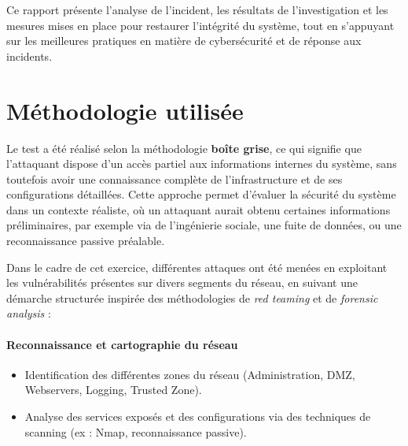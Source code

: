 \documentclass[a4paper,12pt]{report}
\begin{document}
Ce rapport présente l'analyse de l’incident, les résultats de l’investigation et les mesures mises en place pour restaurer l’intégrité du système, tout en s’appuyant sur les meilleures pratiques en matière de cybersécurité et de réponse aux incidents.

\section{Méthodologie utilisée}

Le test a \'et\'e r\'ealis\'e selon la m\'ethodologie \textbf{bo\^ite grise}, ce qui signifie que l’attaquant dispose d’un acc\`es partiel aux informations internes du syst\`eme, sans toutefois avoir une connaissance compl\`ete de l’infrastructure et de ses configurations d\'etaill\'ees. Cette approche permet d’\'evaluer la s\'ecurit\'e du syst\`eme dans un contexte r\'ealiste, o\`u un attaquant aurait obtenu certaines informations pr\'eliminaires, par exemple via de l’ing\'enierie sociale, une fuite de donn\'ees, ou une reconnaissance passive pr\'ealable.

Dans le cadre de cet exercice, diff\'erentes attaques ont \'et\'e men\'ees en exploitant les vuln\'erabilit\'es pr\'esentes sur divers segments du r\'eseau, en suivant une d\'emarche structur\'ee inspir\'ee des m\'ethodologies de \textit{red teaming} et de \textit{forensic analysis} :

\paragraph{Reconnaissance et cartographie du r\'eseau}
\begin{itemize}
    \item Identification des diff\'erentes zones du r\'eseau (Administration, DMZ, Webservers, Logging, Trusted Zone).
    \item Analyse des services expos\'es et des configurations via des techniques de scanning (ex : Nmap, reconnaissance passive).
\end{itemize}
\end{document}
